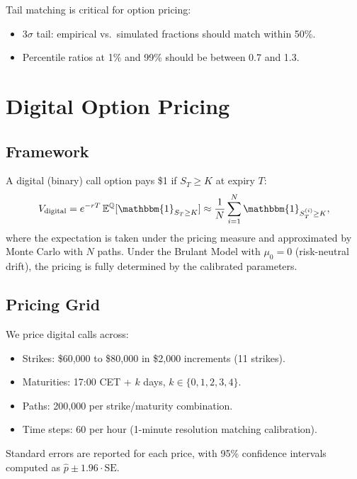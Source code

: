 \documentclass[11pt,a4paper]{article}
\newcommand{\E}{\mathbb{E}}
\begin{document}
Tail matching is critical for option pricing:
\begin{itemize}[nosep]
  \item 3$\sigma$ tail: empirical vs.\ simulated fractions should match
    within 50\%.
  \item Percentile ratios at 1\% and 99\% should be between 0.7 and 1.3.
\end{itemize}

\section{Digital Option Pricing}
\label{sec:pricing}

\subsection{Framework}

A digital (binary) call option pays \$1 if $S_T \geq K$ at expiry $T$:
\begin{equation}
  V_{\text{digital}} = e^{-rT}\, \E^{\mathbb{Q}}[\mathbbm{1}_{S_T \geq K}]
  \approx \frac{1}{N}\sum_{i=1}^{N} \mathbbm{1}_{S_T^{(i)} \geq K},
  \label{eq:digital}
\end{equation}
where the expectation is taken under the pricing measure and approximated
by Monte Carlo with $N$ paths. Under the Brulant Model with $\mu_0 = 0$
(risk-neutral drift), the pricing is fully determined by the calibrated
parameters.

\subsection{Pricing Grid}

We price digital calls across:
\begin{itemize}[nosep]
  \item Strikes: \$60,000 to \$80,000 in \$2,000 increments (11 strikes).
  \item Maturities: 17:00 CET + $k$ days, $k \in \{0, 1, 2, 3, 4\}$.
  \item Paths: 200,000 per strike/maturity combination.
  \item Time steps: 60 per hour (1-minute resolution matching calibration).
\end{itemize}

Standard errors are reported for each price, with 95\% confidence intervals
computed as $\hat{p} \pm 1.96 \cdot \text{SE}$.
\end{document}
